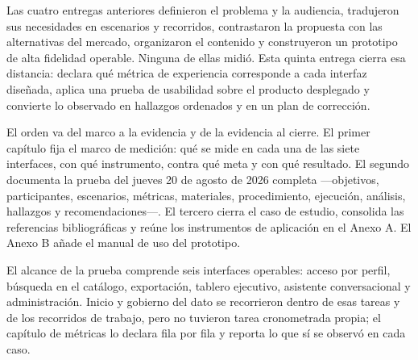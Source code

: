 %
%

Las cuatro entregas anteriores definieron el problema y la audiencia, tradujeron sus necesidades
en escenarios y recorridos, contrastaron la propuesta con las alternativas del mercado,
organizaron el contenido y construyeron un prototipo de alta fidelidad operable. Ninguna de ellas
midió. Esta quinta entrega cierra esa distancia: declara qué métrica de experiencia corresponde a
cada interfaz diseñada, aplica una prueba de usabilidad sobre el producto desplegado y convierte
lo observado en hallazgos ordenados y en un plan de corrección.

El orden va del marco a la evidencia y de la evidencia al cierre. El primer capítulo fija el marco
de medición: qué se mide en cada una de las siete interfaces, con qué instrumento, contra qué meta
y con qué resultado. El segundo documenta la prueba del jueves 20 de agosto de 2026 completa
---objetivos, participantes, escenarios, métricas, materiales, procedimiento, ejecución, análisis,
hallazgos y recomendaciones---. El tercero cierra el caso de estudio, consolida las referencias
bibliográficas y reúne los instrumentos de aplicación en el Anexo A. El Anexo B añade el manual de
uso del prototipo.

El alcance de la prueba comprende seis interfaces operables: acceso por perfil, búsqueda en el
catálogo, exportación, tablero ejecutivo, asistente conversacional y administración. Inicio y
gobierno del dato se recorrieron dentro de esas tareas y de los recorridos de trabajo, pero no
tuvieron tarea cronometrada propia; el capítulo de métricas lo declara fila por fila y reporta lo
que sí se observó en cada caso.

